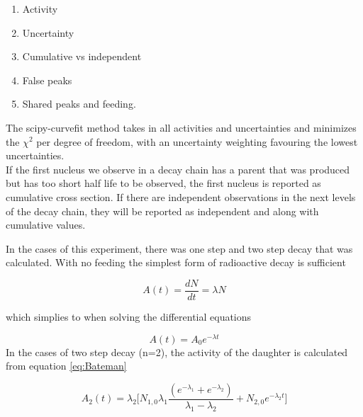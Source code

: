 \documentclass[a4paper,11pt,twoside]{book}
\begin{document}
\noindent 

\begin{enumerate}
    \item Activity 
    \item Uncertainty 
    \item Cumulative vs independent 
    \item False peaks
    \item Shared peaks and feeding. 
\end{enumerate}

\noindent
The scipy-curvefit method takes in all activities and uncertainties and minimizes the $\chi^2$ per degree of freedom, with an uncertainty weighting favouring the lowest uncertainties. \\


\noindent 
If the first nucleus we observe in a decay chain has a parent that was produced but has too short half life to be observed, the first nucleus is reported as cumulative cross section. If there are independent observations in the next levels of the decay chain, they will be reported as independent and along with cumulative values.  

\noindent 
In the cases of this experiment, there was one step and two step decay that was calculated. With no feeding the simplest form of radioactive decay is sufficient

\begin{equation} \label{eq:radioactive_decaylaw}
    A(t)=\frac{dN}{dt}= \lambda N
\end{equation}

\noindent which simplies to when solving the differential equations

\begin{equation} \label{eq:onestep_activity}
    A(t) = A_0 e^{-\lambda t}
\end{equation}
\noindent 
In the cases of two step decay (n=2), the activity of the daughter is calculated from equation \ref{eq:Bateman}

\begin{equation} \label{eq:twostep_activity}
    A_2(t)= \lambda_ 2 \Big[ N_{1,0}\lambda_1 \frac{(e^{-\lambda_1} + e^{-\lambda_2})}{\lambda_1 - \lambda_2} + N_{2,0}e^{-\lambda_2 t}  \Big]
\end{equation}
\end{document}
